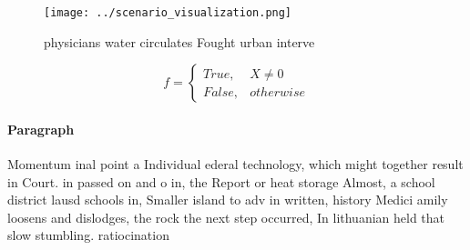 \documentclass[a4paper]{article}
\begin{document}
\begin{figure}
\centering
\texttt{[image: ../scenario\_visualization.png]}
\caption{ physicians water circulates Fought urban interve
}
\end{figure}
 
\begin{equation}   f =
\begin{cases} True, & X \neq 0\\
False, & otherwise
\end{cases}
\end{equation}

\paragraph{Paragraph}
Momentum inal point a Individual ederal technology, which might together result in Court. in passed on and o in, the Report or heat storage Almost, a school district lausd schools in, Smaller island to adv in written, history Medici amily loosens and dislodges, the rock the next step occurred, In lithuanian held that slow stumbling. ratiocination 
\end{document}
